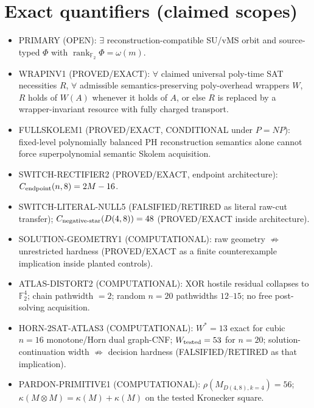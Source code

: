 \documentclass[11pt]{article}
\begin{document}
\section*{Exact quantifiers (claimed scopes)}
\begin{itemize}
\item PRIMARY (OPEN): $\exists$ reconstruction-compatible SU/vMS orbit and source-typed
  $\Phi$ with $\operatorname{rank}_{\mathbb F_2}\Phi=\omega(m)$.
\item WRAPINV1 (PROVED/EXACT): $\forall$ claimed universal poly-time SAT necessities $R$,
  $\forall$ admissible semantics-preserving poly-overhead wrappers $W$, $R$ holds of $W(A)$
  whenever it holds of $A$, or else $R$ is replaced by a wrapper-invariant resource with
  fully charged transport.
\item FULLSKOLEM1 (PROVED/EXACT, CONDITIONAL under $P=NP$): fixed-level polynomially
  balanced PH reconstruction semantics alone cannot force superpolynomial semantic Skolem
  acquisition.
\item SWITCH-RECTIFIER2 (PROVED/EXACT, endpoint architecture):
  $C_{\rm endpoint}(n,8)=2M-16$.
\item SWITCH-LITERAL-NULL5 (FALSIFIED/RETIRED as literal raw-cut transfer);
  $C_{\rm negative\textrm{-}star}(D(4,8))=48$ (PROVED/EXACT inside architecture).
\item SOLUTION-GEOMETRY1 (COMPUTATIONAL): raw geometry $\not\Rightarrow$ unrestricted hardness
  (PROVED/EXACT as a finite counterexample implication inside planted controls).
\item ATLAS-DISTORT2 (COMPUTATIONAL): XOR hostile residual collapses to $\mathbb F_2^4$;
  chain pathwidth $=2$; random $n=20$ pathwidths $12$--$15$; no free post-solving acquisition.
\item HORN-2SAT-ATLAS3 (COMPUTATIONAL): $W^*=13$ exact for cubic $n=16$ monotone/Horn
  dual graph-CNF; $W_{\rm tested}=53$ for $n=20$; solution-continuation width
  $\not\Rightarrow$ decision hardness (FALSIFIED/RETIRED as that implication).
\item PARDON-PRIMITIVE1 (COMPUTATIONAL): $\rho(M_{D(4,8),k=4})=56$;
  $\kappa(M\otimes M)=\kappa(M)+\kappa(M)$ on the tested Kronecker square.
\end{itemize}
\end{document}
